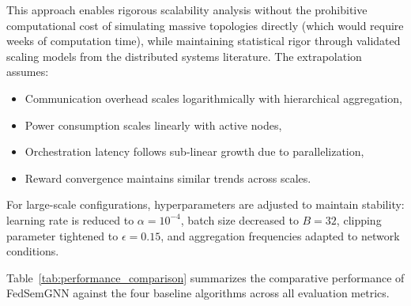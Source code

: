 This approach enables rigorous scalability analysis without the prohibitive computational cost of simulating massive topologies directly (which would require weeks of computation time), while maintaining statistical rigor through validated scaling models from the distributed systems literature. The extrapolation assumes:
\begin{itemize}
	\item Communication overhead scales logarithmically with hierarchical aggregation,
	\item Power consumption scales linearly with active nodes,
	\item Orchestration latency follows sub-linear growth due to parallelization,
	\item Reward convergence maintains similar trends across scales.
\end{itemize}

For large-scale configurations, hyperparameters are adjusted to maintain stability: learning rate is reduced to $\alpha = 10^{-4}$, batch size decreased to $B = 32$, clipping parameter tightened to $\epsilon = 0.15$, and aggregation frequencies adapted to network conditions.

Table~\ref{tab:performance_comparison} summarizes the comparative performance of FedSemGNN against the four baseline algorithms across all evaluation metrics.
